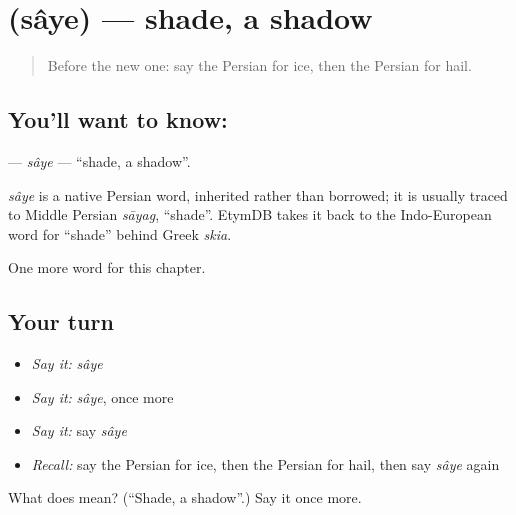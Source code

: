 \section[\texorpdfstring{\fa{سایه} (sâye)}{سایه (sâye)}]{ (sâye) — shade, a shadow}

\label{lesson:FA-C208-saye}



\begin{quote}
Before the new one: say the Persian for ice, then the Persian for hail.
\end{quote}

\subsection*{You'll want to know: }
\textbf{} — \emph{sâye} — \textquotedblleft{}shade, a shadow\textquotedblright{}.

\begin{cousinweb}
\emph{sâye} is a native Persian word, inherited rather than borrowed; it is usually traced to Middle Persian \emph{sāyag}, \textquotedblleft{}shade\textquotedblright{}. EtymDB takes it back to the Indo-European word for \textquotedblleft{}shade\textquotedblright{} behind Greek \emph{skia}.
\end{cousinweb}

\begin{grammarlens}[title={What you've built}]
One more word for this chapter.
\end{grammarlens}

\subsection*{Your turn}
\begin{itemize}
\raggedright
  \item \emph{Say it:} \emph{sâye}
  \item \emph{Say it:} \emph{sâye}, once more
  \item \emph{Say it:} say \emph{sâye}
  \item \emph{Recall:} say the Persian for ice, then the Persian for hail, then say \emph{sâye} again
\end{itemize}

\begin{tcolorbox}[breakable,colback=teal!4,colframe=teal!35!black,title={Before you move on}]
What does  mean? (\textquotedblleft{}Shade, a shadow\textquotedblright{}.) Say it once more.
\end{tcolorbox}
